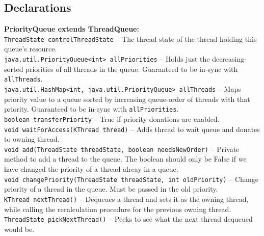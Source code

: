 \documentclass[11pt]{article}
\begin{document}
\subsection{Declarations} %
\textbf{PriorityQueue extends ThreadQueue:} \\
\texttt{ThreadState controlThreadState} -- The thread state of the thread holding this queue's resource. \\
\texttt{java.util.PriorityQueue<int> allPriorities} -- Holds just the decreasing-sorted priorities of all threads in the queue. Guaranteed to be in-sync with \texttt{allThreads}. \\
\texttt{java.util.HashMap<int, java.util.PriorityQueue> allThreads} -- Maps priority value to a queue sorted by increasing queue-order of threads with that priority. Guaranteed to be in-sync with \texttt{allPriorities}. \\
\texttt{boolean transferPriority} -- True if priority donations are enabled. \\
\texttt{void waitForAccess(KThread thread)} -- Adds thread to wait queue and donates to owning thread. \\
\texttt{void add(ThreadState threadState, boolean needsNewOrder)} -- Private method to add a thread to the queue. The boolean should only be False if we have changed the priority of a thread alreay in a queue. \\
\texttt{void changePriority(ThreadState threadState, int oldPriority)} -- Change priority of a thread in the queue. Must be passed in the old priority. \\
\texttt{KThread nextThread()} -- Dequeues a thread and sets it as the owning thread, while calling the recalculation procedure for the previous owning thread. \\
\texttt{ThreadState pickNextThread()} -- Peeks to see what the next thread dequeued would be. \\
\end{document}
